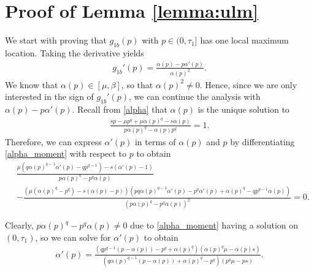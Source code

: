 \documentclass[11pt]{article}
\newcommand{\1}{\mathds{1}}
\begin{document}
\section{Proof of Lemma \ref{lemma:ulm}}\label{appendix_powermoments}
We start with proving that $g_{1b}(p)$ with $p \in (0,\tau_1]$ has one local maximum location. Taking the derivative yields 
\begin{align}\label{eq:z1}
    g_{1b}'(p) = \frac{\alpha(p) - p\alpha'(p)}{\alpha(p)^2}.
\end{align}
We know that $\alpha(p) \in [\mu,\beta]$, so that $\alpha(p)^2 \neq 0$. Hence, since we are only interested in the sign of $g_{1b}'(p)$, we can continue the analysis with $\alpha(p) - p\alpha'(p)$. Recall from \eqref{alpha} that $\alpha(p)$ is the unique solution to
\begin{align}\label{alpha_moment}
    \frac{sp-\mu p^q+\mu \alpha(p)^q-s \alpha(p)}{p \alpha(p)^q-\alpha(p)p^q} = 1.
\end{align}
Therefore, we can express $\alpha'(p)$ in terms of $\alpha(p)$ and $p$ by differentiating \eqref{alpha_moment} with respect to $p$ to obtain
\begin{align}
    &\frac{{\mu} \left(q\alpha(p)^{q-1} \alpha'(p) - qp^{q-1}\right) - s \left(\alpha'(p) - 1\right)}{p \alpha(p)^q - p^q \alpha(p)}\nonumber \\
    &- \frac{\left({\mu} \left(\alpha(p)^q - p^q\right) - s \left(\alpha(p) - p\right)\right) \left(pq\alpha(p)^{q-1} \alpha'(p) - p^q \alpha'(p) + \alpha(p)^q - qp^{q-1} \alpha(p)\right)}{\left(p \alpha(p)^q - p^q \alpha(p)\right)^{2}} = 0.
\end{align}

\noindent Clearly, $p \alpha(p)^q - p^q \alpha(p) \neq 0$ due to \eqref{alpha_moment} having a solution on $(0,\tau_1)$, so we can solve for $\alpha'(p)$ to obtain
\begin{align}
    \alpha'(p) = \frac{\left(qp^{q-1} \left(p - \alpha(p)\right) - p^{q} + \alpha(p)^{q}\right) \left(\alpha(p)^{q} \mu - \alpha(p)s\right)}{\left(q\alpha(p)^{q-1} \left(p - \alpha(p)\right) + \alpha(p)^{q} - p^{q}\right) \left(p^{q} \mu - ps\right)}.\label{eq:alphaprime}
\end{align}
\end{document}
